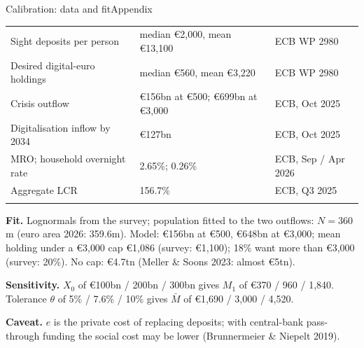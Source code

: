 \documentclass[aspectratio=169,9pt]{beamer}
\begin{document}
\begin{frame}{Calibration: data and fit}{Appendix}
  \footnotesize
  \begin{tabular}{@{}lll@{}}
    Sight deposits per person & median \euro 2{,}000, mean \euro 13{,}100 & ECB WP 2980 \\
    Desired digital-euro holdings & median \euro 560, mean \euro 3{,}220 & ECB WP 2980 \\
    Crisis outflow & \euro 156bn at \euro 500; \euro 699bn at \euro 3{,}000 & ECB, Oct 2025 \\
    Digitalisation inflow by 2034 & \euro 127bn & ECB, Oct 2025 \\
    MRO; household overnight rate & 2.65\%; 0.26\% & ECB, Sep / Apr 2026 \\
    Aggregate LCR & 156.7\% & ECB, Q3 2025 \\
    \arrayrulecolor{hair}\midrule
  \end{tabular}

  \vspace{0.6em}
  \textbf{Fit.} Lognormals from the survey; population fitted to the two outflows: $N=360$m (euro area 2026: 359.6m).
  Model: \euro 156bn at \euro 500, \euro 648bn at \euro 3{,}000; mean holding under a \euro 3{,}000 cap \euro 1{,}086 (survey: \euro 1{,}100); 18\% want more than \euro 3{,}000 (survey: 20\%).
  No cap: \euro 4.7tn (Meller \& Soons 2023: almost \euro 5tn).

  \vspace{0.6em}
  \textbf{Sensitivity.} $X_0$ of \euro 100bn / 200bn / 300bn gives $M_1$ of \euro 370 / 960 / 1{,}840.
  Tolerance $\theta$ of 5\% / 7.6\% / 10\% gives $\bar M$ of \euro 1{,}690 / 3{,}000 / 4{,}520.

  \vspace{0.6em}
  \textbf{Caveat.} $e$ is the private cost of replacing deposits; with central-bank pass-through funding the social cost may be lower (Brunnermeier \& Niepelt 2019).
\end{frame}
\end{document}
